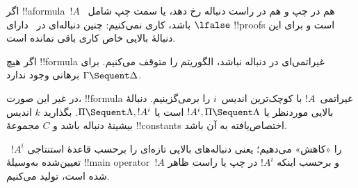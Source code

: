 \documentclass[../../../include/open-logic-section]{subfiles}
\begin{document}
اگر !!a{formula}~$!A$ هم در چپ و هم در راست دنباله رخ دهد، یا سمت چپ
شامل~$\lfalse$ باشد، کاری نمی‌کنیم: چنین دنباله‌ای در~
دارای !!{proof}s است و برای این دنبالهٔ بالایی خاص کاری باقی نمانده
است.

اگر هیچ !!{formula} غیراتمی‌ای در دنباله نباشد، الگوریتم را متوقف
می‌کنیم. برای $\Gamma \Sequent \Delta$ برهانی وجود ندارد.

در غیر این صورت، !!{formula} غیراتمی~$!A$ با کوچک‌ترین اندیس~$i$ را
برمی‌گزینیم. دنبالهٔ بالایی موردنظر یا
$!A^i, \Pi \Sequent \Lambda$ است یا
$\Pi \Sequent \Lambda, !A^i$. بگذارید $k$ اندیس بیشینهٔ دنباله باشد
و $C$ مجموعهٔ !!{constant}s اختصاص‌یافته به آن باشد.

~‌$!A^i$ را «کاهش» می‌دهیم؛ یعنی دنباله‌های بالایی تازه‌ای را برحسب
قاعدهٔ استنتاجی تعیین‌شده به‌وسیلهٔ !!{main operator}~$!A$ و برحسب
اینکه $!A^i$ در چپ یا راست ظاهر شده است، تولید می‌کنیم.
\end{document}
